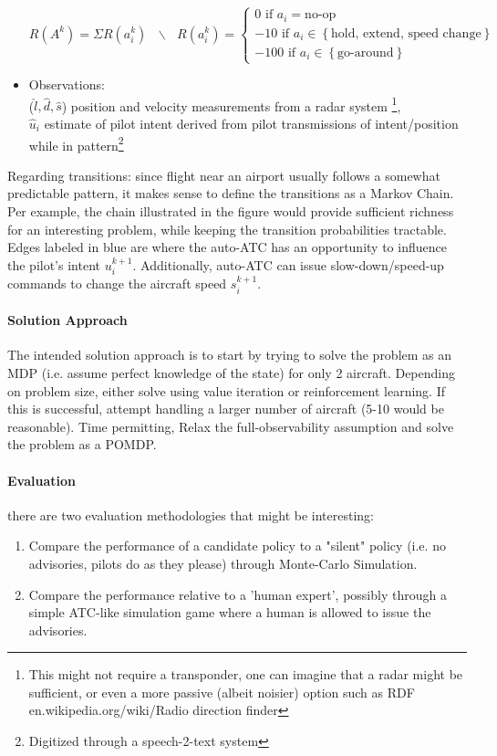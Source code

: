 \documentclass[english]{article}
\begin{document}
\begin{itemize}
$$R(A^k) = \Sigma R(a_i^k) \mbox{  } \backslash  \mbox{  } R(a_i^k) = 
\begin{cases}
0 \mbox{ if } a_i = \mbox{no-op} \\
-10 \mbox{ if } a_i \in \left\{ \mbox{hold, extend, speed change}\right\} \\
-100 \mbox{ if } a_i \in \left\{\mbox{go-around}\right\}
\end{cases}
$$


\item Observations: \\
($\hat{l}, \hat{d}, \hat{s}$) position and velocity measurements  from a radar system \footnote{This might not require a transponder, one can imagine that a radar might be sufficient, or even a more passive (albeit noisier) option such as RDF en.wikipedia.org/wiki/Radio direction finder}, \\
$\hat{u}_i$ estimate of pilot intent derived from pilot transmissions of intent/position while in pattern\footnote{Digitized through a speech-2-text system}
\end{itemize}

Regarding transitions: since flight near an airport usually follows a somewhat predictable pattern, it makes sense to define the transitions as a Markov Chain. Per example, the chain illustrated in the figure would provide sufficient richness for an interesting problem, while keeping the transition probabilities tractable. Edges labeled in blue are where the auto-ATC has an opportunity to influence the pilot's intent $u_i^{k+1}$. Additionally, auto-ATC can issue slow-down/speed-up commands to change the aircraft speed $s_i^{k+1}$.


\paragraph{\textbf{Solution Approach}} The intended solution approach is to start by trying to solve the problem as an MDP (i.e. assume perfect knowledge of the state) for only 2 aircraft. Depending on problem size, either solve using value iteration or reinforcement learning. If this is successful, attempt handling a larger number of aircraft (5-10 would be reasonable). Time permitting, Relax the full-observability assumption and solve the problem as a POMDP.
\paragraph{\textbf{Evaluation}} there are two evaluation methodologies that might be interesting:
\begin{enumerate}
\item Compare the performance of a candidate policy to a "silent" policy (i.e. no advisories, pilots do as they please) through Monte-Carlo Simulation.
\item Compare the performance relative to a 'human expert', possibly through a simple ATC-like simulation game where a human is allowed to issue the advisories.
\end{enumerate}


\end{document}
